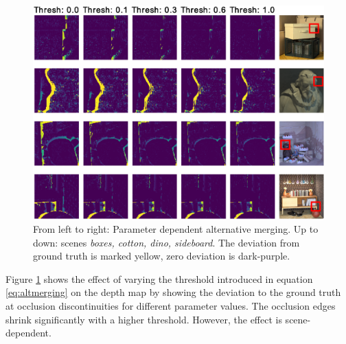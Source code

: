 \documentclass  [
  paper    = a4,
  BCOR     = 10mm,
  twoside,
  fontsize = 12pt,
  fleqn,
  toc      = bibnumbered,
  toc      = listofnumbered,
  numbers  = noendperiod,
  headings = normal,
  listof   = leveldown,
  version  = 3.03
]                                       {scrreprt}
\begin{document}
\begin{figure}[h!]
	\centering
	\includegraphics[width=1\linewidth]{images/choose_lower_difference}
	\caption[Alternative Merging: Parameter dependence]{From left to right: Parameter dependent alternative merging. Up to down: scenes \textit{boxes, cotton, dino, sideboard}. The deviation from ground truth is marked yellow, zero deviation is dark-purple.}
	\label{fig:chooselowerdifference-eps-converted-to}
\end{figure}

 Figure \ref{fig:chooselowerdifference-eps-converted-to} shows the effect of varying the threshold introduced in equation \ref{eq:altmerging} on the depth map by showing the deviation to the ground truth at occlusion discontinuities for different parameter values. The occlusion edges shrink significantly with a higher threshold. However, the effect is scene-dependent.
\end{document}
